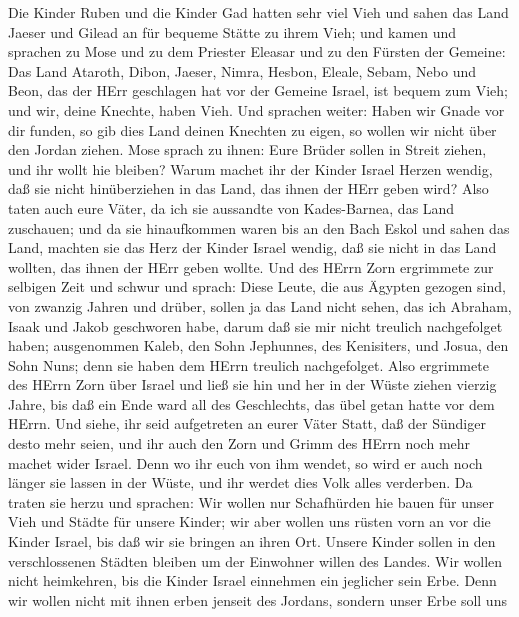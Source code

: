  Die Kinder Ruben und die Kinder Gad hatten sehr viel Vieh
und sahen das Land Jaeser und Gilead an für bequeme Stätte zu ihrem
Vieh;  und kamen und sprachen zu Mose und zu dem Priester
Eleasar und zu den Fürsten der Gemeine:  Das Land Ataroth,
Dibon, Jaeser, Nimra, Hesbon, Eleale, Sebam, Nebo und Beon, 
das der HErr geschlagen hat vor der Gemeine Israel, ist bequem zum Vieh;
und wir, deine Knechte, haben Vieh.  Und sprachen weiter:
Haben wir Gnade vor dir funden, so gib dies Land deinen Knechten zu
eigen, so wollen wir nicht über den Jordan ziehen.  Mose
sprach zu ihnen: Eure Brüder sollen in Streit ziehen, und ihr wollt hie
bleiben?  Warum machet ihr der Kinder Israel Herzen wendig,
daß sie nicht hinüberziehen in das Land, das ihnen der HErr geben wird?
 Also taten auch eure Väter, da ich sie aussandte von
Kades-Barnea, das Land zuschauen;  und da sie hinaufkommen
waren bis an den Bach Eskol und sahen das Land, machten sie das Herz der
Kinder Israel wendig, daß sie nicht in das Land wollten, das ihnen der
HErr geben wollte.  Und des HErrn Zorn ergrimmete zur
selbigen Zeit und schwur und sprach:  Diese Leute, die aus
Ägypten gezogen sind, von zwanzig Jahren und drüber, sollen ja das Land
nicht sehen, das ich Abraham, Isaak und Jakob geschworen habe, darum daß
sie mir nicht treulich nachgefolget haben;  ausgenommen
Kaleb, den Sohn Jephunnes, des Kenisiters, und Josua, den Sohn Nuns;
denn sie haben dem HErrn treulich nachgefolget.  Also
ergrimmete des HErrn Zorn über Israel und ließ sie hin und her in der
Wüste ziehen vierzig Jahre, bis daß ein Ende ward all des Geschlechts,
das übel getan hatte vor dem HErrn.  Und siehe, ihr seid
aufgetreten an eurer Väter Statt, daß der Sündiger desto mehr seien, und
ihr auch den Zorn und Grimm des HErrn noch mehr machet wider Israel.
 Denn wo ihr euch von ihm wendet, so wird er auch noch
länger sie lassen in der Wüste, und ihr werdet dies Volk alles
verderben.  Da traten sie herzu und sprachen: Wir wollen
nur Schafhürden hie bauen für unser Vieh und Städte für unsere Kinder;
 wir aber wollen uns rüsten vorn an vor die Kinder Israel,
bis daß wir sie bringen an ihren Ort. Unsere Kinder sollen in den
verschlossenen Städten bleiben um der Einwohner willen des Landes.
 Wir wollen nicht heimkehren, bis die Kinder Israel
einnehmen ein jeglicher sein Erbe.  Denn wir wollen nicht
mit ihnen erben jenseit des Jordans, sondern unser Erbe soll uns
